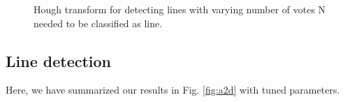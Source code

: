 \documentclass[11pt,a4paper]{article}
\begin{document}
\begin{figure}%
\centering
{}
\quad
{}
\quad
{}
\quad
\caption{Hough transform for detecting lines with varying number of votes N needed to be classified as line.}%
\label{fig:a2c}%
\end{figure}

\subsection{Line detection}
Here, we have summarized our results in Fig. \ref{fig:a2d} with tuned parameters.
\end{document}
